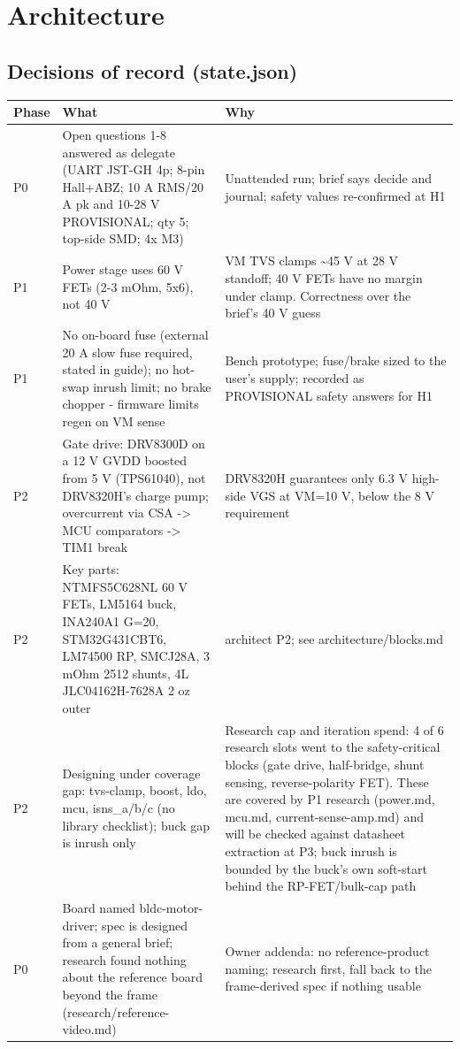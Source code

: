 \documentclass[11pt,a4paper]{article}
\begin{document}
\section{Architecture}
\subsection*{Decisions of record (state.json)}
{\small
\begin{longtable}{lp{5.2cm}p{7.2cm}}
\toprule
\textbf{Phase} & \textbf{What} & \textbf{Why} \\
\midrule
\endhead
P0 & Open questions 1-8 answered as delegate (UART JST-GH 4p; 8-pin Hall+ABZ; 10 A RMS/20 A pk and 10-28 V PROVISIONAL; qty 5; top-side SMD; 4x M3) & Unattended run; brief says decide and journal; safety values re-confirmed at H1 \\
P1 & Power stage uses 60 V FETs (2-3 mOhm, 5x6), not 40 V & VM TVS clamps \textasciitilde{}45 V at 28 V standoff; 40 V FETs have no margin under clamp. Correctness over the brief's 40 V guess \\
P1 & No on-board fuse (external 20 A slow fuse required, stated in guide); no hot-swap inrush limit; no brake chopper - firmware limits regen on VM sense & Bench prototype; fuse/brake sized to the user's supply; recorded as PROVISIONAL safety answers for H1 \\
P2 & Gate drive: DRV8300D on a 12 V GVDD boosted from 5 V (TPS61040), not DRV8320H's charge pump; overcurrent via CSA -\textgreater{} MCU comparators -\textgreater{} TIM1 break & DRV8320H guarantees only 6.3 V high-side VGS at VM=10 V, below the 8 V requirement \\
P2 & Key parts: NTMFS5C628NL 60 V FETs, LM5164 buck, INA240A1 G=20, STM32G431CBT6, LM74500 RP, SMCJ28A, 3 mOhm 2512 shunts, 4L JLC04162H-7628A 2 oz outer & architect P2; see architecture/blocks.md \\
P2 & Designing under coverage gap: tvs-clamp, boost, ldo, mcu, isns\_a/b/c (no library checklist); buck gap is inrush only & Research cap and iteration spend: 4 of 6 research slots went to the safety-critical blocks (gate drive, half-bridge, shunt sensing, reverse-polarity FET). These are covered by P1 research (power.md, mcu.md, current-sense-amp.md) and will be checked against datasheet extraction at P3; buck inrush is bounded by the buck's own soft-start behind the RP-FET/bulk-cap path \\
P0 & Board named bldc-motor-driver; spec is designed from a general brief; research found nothing about the reference board beyond the frame (research/reference-video.md) & Owner addenda: no reference-product naming; research first, fall back to the frame-derived spec if nothing usable \\

\end{longtable}}
\end{document}
